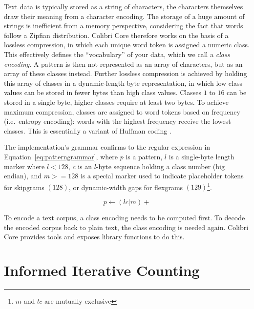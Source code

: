 \documentclass[review]{elsarticle}
\begin{document}
Text data is typically stored as a string of characters, the characters
themselves draw their meaning from a character encoding. The storage of a huge
amount of strings is inefficient from a memory perspective, considering the
fact that words follow a Zipfian distribution. Colibri Core therefore works on
the basis of a lossless compression, in which each unique word token is
assigned a numeric class. This effectively defines the ``vocabulary'' of your
data, which we call a \emph{class encoding}. A pattern is then not represented
as an array of characters, but as an array of these classes instead. Further
lossless compression is achieved by holding this array of classes in a
dynamic-length byte representation, in which low class values can be stored in
fewer bytes than high class values. Classes $1$ to $16$ can be stored in a
single byte, higher classes require at least two bytes. To achieve maximum
compression, classes are assigned to word tokens based on frequency (i.e.\
entropy encoding): words with the highest frequency receive the lowest classes.
This is essentially a variant of Huffman coding \citep{HUFFMAN}.

The implementation's grammar confirms to the regular expression in
Equation~\ref{eq:patterngrammar}, where $p$ is a pattern, $l$ is a single-byte
length marker where $l<128$, $c$ is an $l$-byte sequence holding a class number
(big endian), and $m>=128$ is a special marker used to indicate placeholder
tokens for skipgrams $(128)$, or dynamic-width gaps for flexgrams
$(129)$\footnote{$m$ and $lc$ are mutually exclusive}.

\begin{equation}
\label{eq:patterngrammar}
p \leftarrow (lc|m)+
\end{equation}

To encode a text corpus, a class encoding needs to be computed first. To decode
the encoded corpus back to plain text, the class encoding is needed again.
Colibri Core provides tools and exposes library functions to do this.

\section{Informed Iterative Counting}
\end{document}
